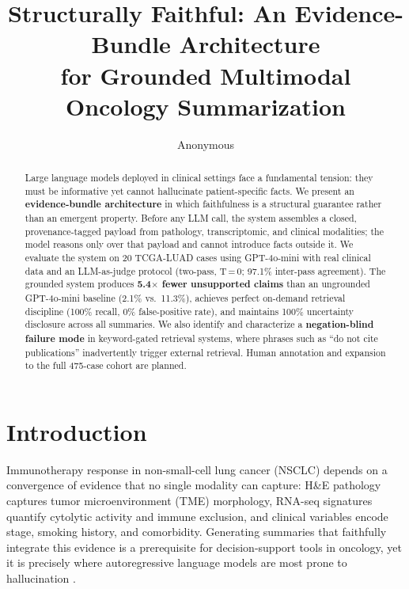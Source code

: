 \documentclass[11pt,twocolumn]{article}
\title{Structurally Faithful: An Evidence-Bundle Architecture\\
       for Grounded Multimodal Oncology Summarization}
\author{Anonymous}
\date{}
\begin{document}
\maketitle

\begin{abstract}
Large language models deployed in clinical settings face a fundamental
tension: they must be informative yet cannot hallucinate patient-specific
facts. We present an \textbf{evidence-bundle architecture} in which
faithfulness is a structural guarantee rather than an emergent property.
Before any LLM call, the system assembles a closed, provenance-tagged
payload from pathology, transcriptomic, and clinical modalities; the
model reasons only over that payload and cannot introduce facts outside
it. We evaluate the system on 20 TCGA-LUAD cases using GPT-4o-mini with
real clinical data and an LLM-as-judge protocol (two-pass, T\,=\,0;
97.1\% inter-pass agreement). The grounded system produces
\textbf{5.4$\times$ fewer unsupported claims} than an ungrounded
GPT-4o-mini baseline (2.1\% vs.\ 11.3\%), achieves perfect on-demand
retrieval discipline (100\% recall, 0\% false-positive rate), and
maintains 100\% uncertainty disclosure across all summaries. We also
identify and characterize a \textbf{negation-blind failure mode} in
keyword-gated retrieval systems, where phrases such as ``do not cite
publications'' inadvertently trigger external retrieval. Human annotation
and expansion to the full 475-case cohort are planned.
\end{abstract}

\section{Introduction}

Immunotherapy response in non-small-cell lung cancer (NSCLC) depends on
a convergence of evidence that no single modality can capture: H\&E
pathology captures tumor microenvironment (TME) morphology, RNA-seq
signatures quantify cytolytic activity and immune exclusion, and clinical
variables encode stage, smoking history, and comorbidity. Generating
summaries that faithfully integrate this evidence is a prerequisite for
decision-support tools in oncology, yet it is precisely where
autoregressive language models are most prone to hallucination
\cite{ji2023survey,umapathi2023med}.
\end{document}
